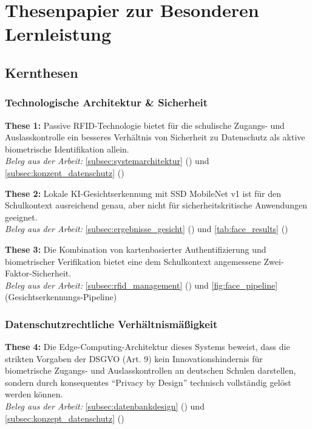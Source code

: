
\section*{Thesenpapier zur Besonderen Lernleistung}

\subsection*{Kernthesen}
\vspace{0.5em}

\subsubsection*{Technologische Architektur \& Sicherheit}

\textbf{These 1:} Passive RFID-Technologie bietet für die schulische Zugangs- und Auslasskontrolle ein besseres Verhältnis von Sicherheit zu Datenschutz als aktive biometrische Identifikation allein.\\
\textit{Beleg aus der Arbeit:} \autoref{subsec:systemarchitektur} () und \autoref{subsec:konzept_datenschutz} ()

\textbf{These 2:} Lokale KI-Gesichtserkennung mit SSD MobileNet v1 ist für den Schulkontext ausreichend genau, aber nicht für sicherheitskritische Anwendungen geeignet.\\
\textit{Beleg aus der Arbeit:} \autoref{subsec:ergebnisse_gesicht} () und \autoref{tab:face_results} ()

\textbf{These 3:} Die Kombination von kartenbasierter Authentifizierung und biometrischer Verifikation bietet eine dem Schulkontext angemessene Zwei-Faktor-Sicherheit.\\
\textit{Beleg aus der Arbeit:} \autoref{subsec:rfid_management} () und \autoref{fig:face_pipeline} (Gesichtserkennungs-Pipeline)

\subsubsection*{Datenschutzrechtliche Verhältnismäßigkeit}

\textbf{These 4:} Die Edge-Computing-Architektur dieses Systems beweist, dass die strikten Vorgaben der DSGVO (Art. 9) kein Innovationshindernis für biometrische Zugangs- und Auslasskontrollen an deutschen Schulen darstellen, sondern durch konsequentes \enquote{Privacy by Design} technisch vollständig gelöst werden können.\\
\textit{Beleg aus der Arbeit:} \autoref{subsec:datenbankdesign} () und \autoref{subsec:konzept_datenschutz} ()

